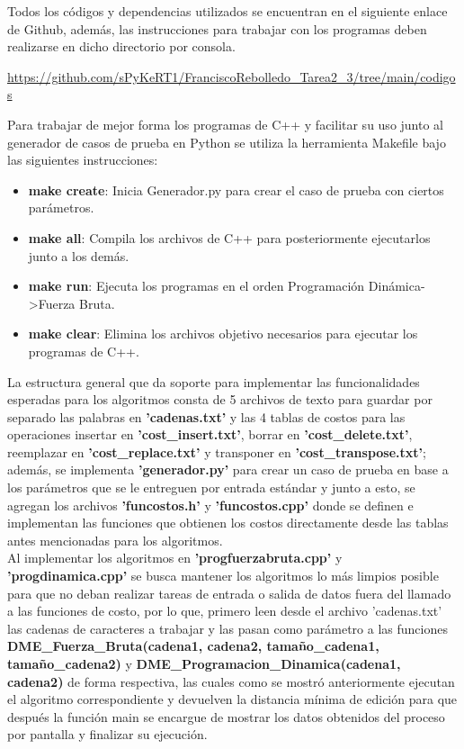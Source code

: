 Todos los códigos y dependencias utilizados se encuentran en el siguiente enlace de Github, además, las instrucciones para trabajar con los programas deben realizarse en dicho directorio por consola.

\begin{mdframed}
\url{https://github.com/sPyKeRT1/FranciscoRebolledo_Tarea2_3/tree/main/codigos}
\end{mdframed}

Para trabajar de mejor forma los programas de C++ y facilitar su uso junto al generador de casos de prueba en Python se utiliza la herramienta Makefile bajo las siguientes instrucciones:

\begin{itemize}
    \item \textbf{make create}: Inicia Generador.py para crear el caso de prueba con ciertos parámetros.
    \item \textbf{make all}: Compila los archivos de C++ para posteriormente ejecutarlos junto a los demás.
    \item \textbf{make run}: Ejecuta los programas en el orden Programación Dinámica->Fuerza Bruta.
    \item \textbf{make clear}: Elimina los archivos objetivo necesarios para ejecutar los programas de C++.
\end{itemize}

La estructura general que da soporte para implementar las funcionalidades esperadas para los algoritmos consta de 5 archivos de texto para guardar por separado las palabras en \textbf{'cadenas.txt'} y las 4 tablas de costos para las operaciones insertar en \textbf{'cost\_insert.txt'}, borrar en \textbf{'cost\_delete.txt'}, reemplazar en \textbf{'cost\_replace.txt'} y transponer en \textbf{'cost\_transpose.txt'}; además, se implementa \textbf{'generador.py'} para crear un caso de prueba en base a los parámetros que se le entreguen por entrada estándar y junto a esto, se agregan los archivos \textbf{'funcostos.h'} y \textbf{'funcostos.cpp'} donde se definen e implementan las funciones que obtienen los costos directamente desde las tablas antes mencionadas para los algoritmos.\\

Al implementar los algoritmos en \textbf{'progfuerzabruta.cpp'} y \textbf{'progdinamica.cpp'} se busca mantener los algoritmos lo más limpios posible para que no deban realizar tareas de entrada o salida de datos fuera del llamado a las funciones de costo, por lo que, primero leen desde el archivo 'cadenas.txt' las cadenas de caracteres a trabajar y las pasan como parámetro a las funciones \textbf{DME\_Fuerza\_Bruta(cadena1, cadena2, tamaño\_cadena1, tamaño\_cadena2)} y \textbf{DME\_Programacion\_Dinamica(cadena1, cadena2)}  de forma respectiva, las cuales como se mostró anteriormente ejecutan el algoritmo 
correspondiente y devuelven la distancia mínima de edición para que después la función main se encargue de mostrar los datos obtenidos del proceso por pantalla y finalizar su ejecución. 
